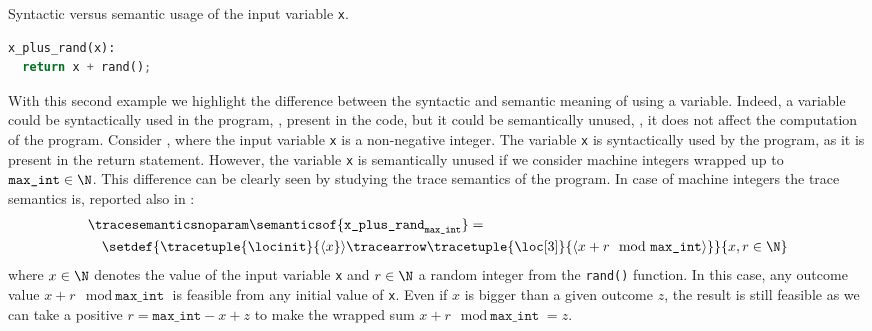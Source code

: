 \begin{example}
  \begin{marginlisting}
    \caption{Syntactic versus semantic usage of the input variable \texttt{x}.}
    \vspace{2\lineheight}
  \begin{lstlisting}[style=mystyle,language=Python]
x_plus_rand(x):
  return x + rand();
 \end{lstlisting}
  \end{marginlisting}
With this second example we highlight the difference between the syntactic and semantic meaning of using a variable. Indeed, a variable could be syntactically used in the program, \ie, present in the code, but it could be semantically unused, \ie, it does not affect the computation of the program.
Consider , where the input variable \texttt{x} is a non-negative integer.
The variable \texttt{x} is syntactically used by the program, as it is present in the return statement.
However, the variable \texttt{x} is semantically unused if we consider machine integers wrapped up to $\texttt{max\_int}\in\N$.
This difference can be clearly seen by studying the trace semantics of the program. In case of machine integers the trace semantics is, reported also in :
\begin{align*}
  &\tracesemanticsnoparam\semanticsof{\texttt{x\_plus\_rand}_{\texttt{max\_int}}}
  =\\
  &\quad\setdef{
    \tracetuple{\locinit}{\langle{x}}\rangle\tracearrow\tracetuple{\loc[3]}{\langle{x+r \mod \texttt{max\_int}}\rangle}
  }{x, r \in \N}
\end{align*}
where $x\in\N$ denotes the value of the input variable \texttt{x} and $r\in\N$ a random integer from the \texttt{rand()} function.
In this case, any outcome value $x+r \mod \texttt{max\_int}$ is feasible from any initial value of \texttt{x}.
Even if $x$ is bigger than a given outcome $z$, the result is still feasible as we can take a positive $r = \texttt{max\_int} - x + z$ to make the wrapped sum $x + r \mod \texttt{max\_int} = z$.
\begin{marginfigure}[*-10]
\end{marginfigure}
\end{example}
